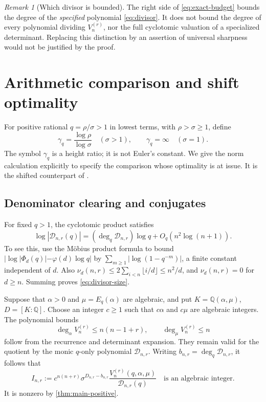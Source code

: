 \documentclass[11pt]{article}
\numberwithin{equation}{section}
\theoremstyle{definition}
\theoremstyle{remark}
\newtheorem{remark}[remark]{Remark}
\newcommand{\Q}{\mathbb{Q}}
\newcommand{\degq}{\operatorname{deg}_q}
\newcommand{\DD}{\mathcal{D}}
\begin{document}
\begin{remark}[Which divisor is bounded]
The right side of \eqref{eq:exact-budget} bounds the degree of the
\emph{specified} polynomial \eqref{eq:divisor}. It does not bound the degree
of every polynomial dividing $V_n^{(r)}$, nor the full cyclotomic valuation
of a specialized determinant. Replacing this distinction by an assertion of
universal sharpness would not be justified by the proof.
\end{remark}

\section{Arithmetic comparison and shift optimality}\label{sec:arithmetic}

For positive rational $q=\rho/\sigma>1$ in lowest terms, with
$\rho>\sigma\ge1$, define
\begin{equation}\label{eq:gamma}
 \gamma_q=\frac{\log\rho}{\log\sigma}\quad(\sigma>1),\qquad
 \gamma_q=\infty\quad(\sigma=1).
\end{equation}
The symbol $\gamma_q$ is a height ratio; it is not Euler's constant.
We give the norm calculation explicitly to specify the comparison whose
optimality is at issue. It is the shifted counterpart of
\cite[Section 5]{KRVZ}.

\subsection{Denominator clearing and conjugates}

For fixed $q>1$, the cyclotomic product satisfies
\begin{equation}\label{eq:divisor-size}
 \log|\DD_{n,r}(q)|=(\degq\DD_{n,r})\log q+O_q(n^2\log(n+1)).
\end{equation}
To see this, use the M\"obius product formula to bound
$|\log|\Phi_d(q)|-\varphi(d)\log q|$ by
$\sum_{m\ge1}|\log(1-q^{-m})|$, a finite constant independent of $d$.
Also $\nu_d(n,r)\le2\sum_{i<n}\lfloor i/d\rfloor\le n^2/d$, and
$\nu_d(n,r)=0$ for $d\ge n$. Summing proves \eqref{eq:divisor-size}.

Suppose that $\alpha>0$ and $\mu=E_q(\alpha)$ are algebraic, and put
$K=\Q(\alpha,\mu)$, $D=[K:\Q]$. Choose an integer $c\ge1$ such that
$c\alpha$ and $c\mu$ are algebraic integers. The polynomial bounds
\[
 \deg_\alpha V_n^{(r)}\le n(n-1+r),\qquad
 \deg_\mu V_n^{(r)}\le n
\]
follow from the recurrence and determinant expansion. They remain valid
for the quotient by the monic $q$-only polynomial $\DD_{n,r}$.
Writing $b_{n,r}=\degq\DD_{n,r}$, it follows that
\begin{equation}\label{eq:integer}
 I_{n,r}:=c^{n(n+r)}\sigma^{D_{n,r}-b_{n,r}}
 \frac{V_n^{(r)}(q,\alpha,\mu)}{\DD_{n,r}(q)}
 \quad\text{is an algebraic integer.}
\end{equation}
It is nonzero by \cref{thm:main-positive}.
\end{document}
